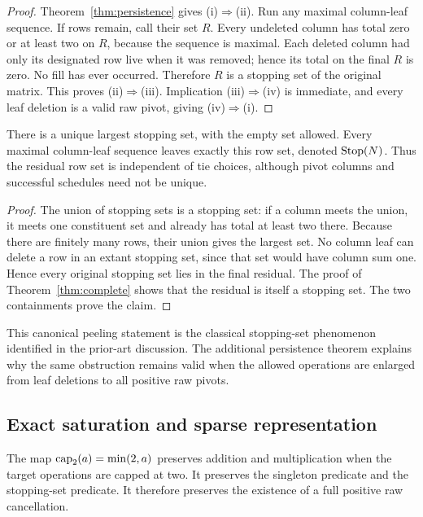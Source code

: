 \begin{proof}
Theorem~\ref{thm:persistence} gives (i)$\Rightarrow$(ii).
Run any maximal column-leaf sequence. If rows remain, call their set $R$.
Every undeleted column has total zero or at least two on $R$, because the
sequence is maximal. Each deleted column had only its designated row live
when it was removed; hence its total on the final $R$ is zero. No fill has
ever occurred. Therefore $R$ is a stopping set of the original matrix.
This proves (ii)$\Rightarrow$(iii). Implication (iii)$\Rightarrow$(iv) is
immediate, and every leaf deletion is a valid raw pivot, giving
(iv)$\Rightarrow$(i).
\end{proof}

\begin{corollary}
\label{cor:canonical}
There is a unique largest stopping set, with the empty set allowed.
Every maximal column-leaf sequence leaves exactly this row set, denoted
$\operatorname{Stop}(N)$. Thus the residual row set is independent of tie choices,
although pivot columns and successful schedules need not be unique.
\end{corollary}

\begin{proof}
The union of stopping sets is a stopping set: if a column meets the union,
it meets one constituent set and already has total at least two there.
Because there are finitely many rows, their union gives the largest set.
No column leaf can delete a row in an extant stopping set, since that set
would have column sum one. Hence every original stopping set lies in the
final residual. The proof of Theorem~\ref{thm:complete} shows that the
residual is itself a stopping set. The two containments prove the claim.
\end{proof}

This canonical peeling statement is the classical stopping-set phenomenon
identified in the prior-art discussion. The additional persistence theorem
explains why the same obstruction remains valid when the allowed operations
are enlarged from leaf deletions to all positive raw pivots.

\subsection{Exact saturation and sparse representation}

\begin{lemma}
\label{lem:saturation}
The map $\operatorname{cap}_2(a)=\min(2,a)$ preserves addition and multiplication when
the target operations are capped at two. It preserves the singleton
predicate and the stopping-set predicate. It therefore preserves the
existence of a full positive raw cancellation.
\end{lemma}

